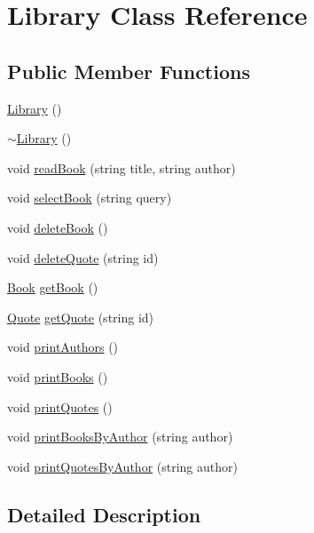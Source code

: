 \hypertarget{class_library}{\section{Library Class Reference}
\label{class_library}
}
\subsection*{Public Member Functions}
\begin{DoxyCompactItemize}
\item 
\hyperlink{class_library_a82338219d8bf51962ff5f60a0db21b19}{Library} ()
\item 
\hyperlink{class_library_a62120f28a9b50cc5b151d868e42ab936}{$\sim$\+Library} ()
\item 
void \hyperlink{class_library_ab6fb1208e63af938df64fa831cbacb40}{read\+Book} (string title, string author)
\item 
void \hyperlink{class_library_a6dd541a183a89a4d35a80834ed9d8d71}{select\+Book} (string query)
\item 
void \hyperlink{class_library_a0248e22f1ba1611d3b3c8b7843a6d8b9}{delete\+Book} ()
\item 
void \hyperlink{class_library_a705ee20f1edab1ebf274c9e2cbb4d7a3}{delete\+Quote} (string id)
\item 
\hyperlink{class_book}{Book} \hyperlink{class_library_a67ccad51c76c3abfb0d46fa533f46e03}{get\+Book} ()
\item 
\hyperlink{class_quote}{Quote} \hyperlink{class_library_aba57d7dcf92c9da4c3d8a359ceba7e2b}{get\+Quote} (string id)
\item 
void \hyperlink{class_library_aba2ed0b3b1ee81565ca5b62f2ac5c924}{print\+Authors} ()
\item 
void \hyperlink{class_library_a35220a3b5a4a6d9059cc4fc18ae4c0c3}{print\+Books} ()
\item 
void \hyperlink{class_library_a819acb04f4b8aea0547db50918b1c5fa}{print\+Quotes} ()
\item 
void \hyperlink{class_library_a6e22621933979ff5cb4e95de3f54b72c}{print\+Books\+By\+Author} (string author)
\item 
void \hyperlink{class_library_aa13544bfe57c61164d9953518e88dcb0}{print\+Quotes\+By\+Author} (string author)
\end{DoxyCompactItemize}


\subsection{Detailed Description}


